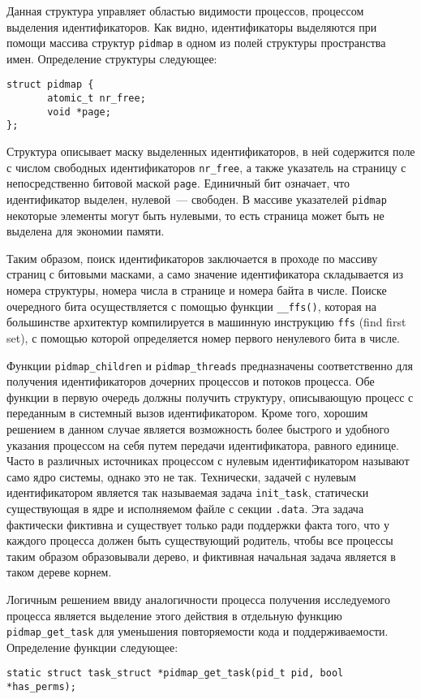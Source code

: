 Данная структура управляет областью видимости процессов, процессом выделения
идентификаторов. Как видно, идентификаторы выделяются при помощи массива
структур \texttt{pidmap} в одном из полей структуры пространства имен.
Определение структуры следующее:
\medskip
\begin{lstlisting}[style=cstyle]
struct pidmap {
       atomic_t nr_free;
       void *page;
};
\end{lstlisting}
\medskip

Структура описывает маску выделенных идентификаторов, в ней содержится поле с
числом свободных идентификаторов \texttt{nr\_free}, а также указатель на
страницу с непосредственно битовой маской \texttt{page}. Единичный бит означает,
что идентификатор выделен, нулевой~--- свободен. В массиве указателей
\texttt{pidmap} некоторые элементы могут быть нулевыми, то есть страница
может быть не выделена для экономии памяти.

Таким образом, поиск идентификаторов заключается в проходе по массиву страниц с
битовыми масками, а само значение идентификатора складывается из номера
структуры, номера числа в странице и номера байта в числе. Поиске очередного
бита осуществляется с помощью функции \texttt{\_\_ffs()}, которая на большинстве
архитектур компилируется в машинную инструкцию \texttt{ffs} (find first set), с
помощью которой определяется номер первого ненулевого бита в числе.

Функции \texttt{pidmap\_children} и \texttt{pidmap\_threads} предназначены
соответственно для получения идентификаторов дочерних процессов и потоков
процесса. Обе функции в первую очередь должны получить структуру, описывающую
процесс с переданным в системный вызов идентификатором. Кроме того, хорошим
решением в данном случае является возможность более быстрого и удобного указания
процессом на себя путем передачи идентификатора, равного единице. Часто в
различных источниках процессом с нулевым идентификатором называют само ядро
системы, однако это не так. Технически, задачей с нулевым идентификатором
является так называемая задача \texttt{init\_task}, статически существующая в
ядре и исполняемом файле с секции \texttt{.data}. Эта задача фактически фиктивна
и существует только ради поддержки факта того, что у каждого процесса должен
быть существующий родитель, чтобы все процессы таким образом образовывали
дерево, и фиктивная начальная задача является в таком дереве корнем.

Логичным решением ввиду аналогичности процесса получения исследуемого процесса
является выделение этого действия в отдельную функцию \texttt{pidmap\_get\_task}
для уменьшения повторяемости кода и поддерживаемости. Определение функции
следующее:
\medskip
\begin{lstlisting}[style=cstyle]
static struct task_struct *pidmap_get_task(pid_t pid, bool *has_perms);
\end{lstlisting}
\medskip

